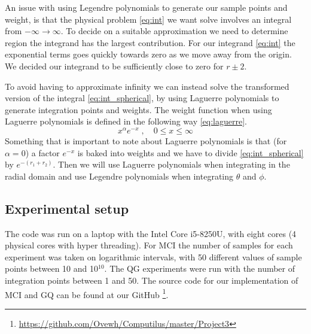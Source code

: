 An issue with using Legendre polynomials to generate our sample points and
weight, is that the physical problem \cref{eq:int} we want solve involves an
integral from $-\infty \to \infty$. To decide on a suitable approximation we
need to determine region the integrand has the largest contribution. For our
integrand \cref{eq:int} the exponential terms goes quickly towards zero as we
move away from the origin. We decided our integrand to be sufficiently close to
zero for $r \pm 2 $.

To avoid having to approximate infinity we can instead solve the
transformed version of the integral \cref{eq:int_spherical}, by using Laguerre
polynomials to generate integration points and weights. The weight function
when using
Laguerre polynomials is defined in the following way \cref{eq:laguerre}.
\begin{equation}\label{eq:laguerre}
 x^{\alpha} e^{-x} \; , \quad 0 \le x \le \infty
\end{equation}
Something that is important to note about Laguerre polynomials is that (for
$\alpha = 0$)
a factor $e^{- x}$ is baked into weights and we have to divide
\cref{eq:int_spherical} by $e^{-(r_1 + r_2)}$. Then we will use Laguerre
polynomials when integrating in the radial domain and use Legendre polynomials
when integrating $\theta$ and $\phi$.



\subsection{Experimental setup}

The code was run on a laptop with the Intel Core i5-8250U, with eight cores
(4 physical cores with hyper threading). For MCI
the number of samples for each experiment was taken on logarithmic intervals,
with 50 different values of sample points between 10 and 10$^{10}$. The QG
experiments were run with the number of integration points between 1 and 50.
The source code for our implementation of MCI and GQ can be found at our GitHub
\footnote{\url{https://github.com/Ovewh/Computilus/master/Project3}}.

